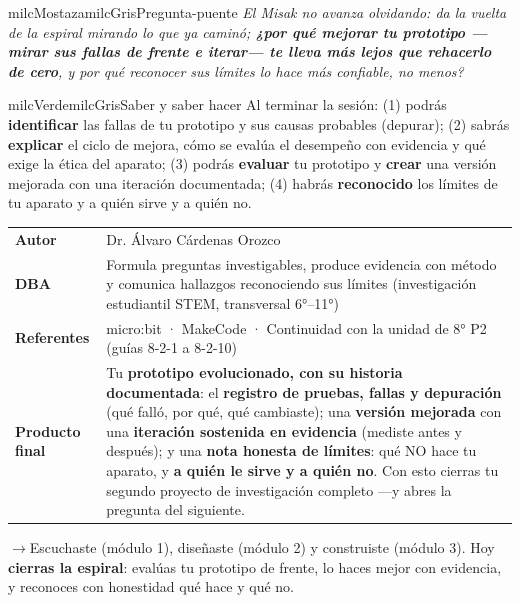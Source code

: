 \documentclass[11pt,letterpaper]{article}
\newcommand{\puente}[1]{%
  \begin{puentebox}%
    \textcolor{milcGradeDark}{$\rightarrow$}\hspace{2mm}#1%
  \end{puentebox}%
}
\begin{document}
\begin{softbox}{milcMostaza}{milcGris}{Pregunta-puente}
\textit{El Misak no avanza olvidando: da la vuelta de la espiral mirando lo que ya caminó; \textbf{¿por qué mejorar tu prototipo ---mirar sus fallas de frente e iterar--- te lleva más lejos que rehacerlo de cero}, y por qué reconocer sus límites lo hace más confiable, no menos?}
\end{softbox}

\begin{softbox}{milcVerde}{milcGris}{Saber y saber hacer}
Al terminar la sesión: (1) podrás \textbf{identificar} las fallas de tu prototipo y sus causas probables (depurar); (2) sabrás \textbf{explicar} el ciclo de mejora, cómo se evalúa el desempeño con evidencia y qué exige la ética del aparato; (3) podrás \textbf{evaluar} tu prototipo y \textbf{crear} una versión mejorada con una iteración documentada; (4) habrás \textbf{reconocido} los límites de tu aparato y a quién sirve y a quién no.
\end{softbox}



\small
\begin{tabularx}{\textwidth}{>{\bfseries}p{3.0cm}Y}
Autor & Dr. Álvaro Cárdenas Orozco\\
DBA & Formula preguntas investigables, produce evidencia con método y comunica hallazgos reconociendo sus límites (investigación estudiantil STEM, transversal 6°--11°)\\
Referentes & micro:bit · MakeCode · Continuidad con la unidad de 8° P2 (guías 8-2-1 a 8-2-10)\\
Producto final & Tu \textbf{prototipo evolucionado, con su historia documentada}: el \textbf{registro de pruebas, fallas y depuración} (qué falló, por qué, qué cambiaste); una \textbf{versión mejorada} con una \textbf{iteración sostenida en evidencia} (mediste antes y después); y una \textbf{nota honesta de límites}: qué NO hace tu aparato, y \textbf{a quién le sirve y a quién no}. Con esto cierras tu segundo proyecto de investigación completo ---y abres la pregunta del siguiente.\\
\end{tabularx}
\normalsize

\puente{Escuchaste (módulo 1), diseñaste (módulo 2) y construiste (módulo 3). Hoy \textbf{cierras la espiral}: evalúas tu prototipo de frente, lo haces mejor con evidencia, y reconoces con honestidad qué hace y qué no.}
\end{document}
